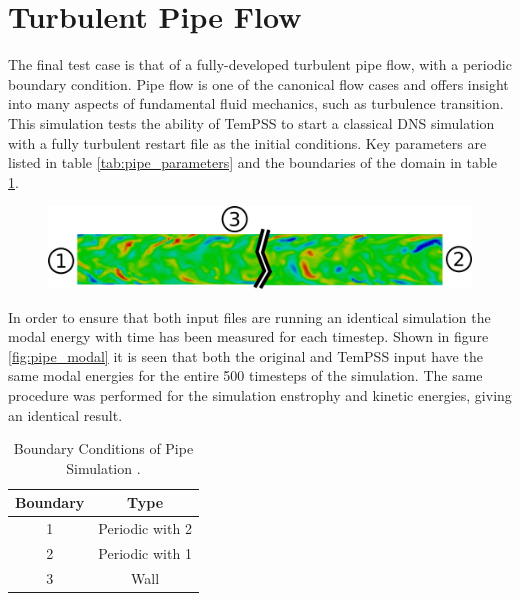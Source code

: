 \documentclass[11pt, a4paper]{report}
\begin{document}
\newpage
\section{Turbulent Pipe Flow}
The final test case is that of a fully-developed turbulent pipe flow, with a periodic boundary condition. Pipe flow is one of the canonical flow cases and offers insight into many aspects of fundamental fluid mechanics, such as turbulence transition. This simulation tests the ability of TemPSS to start a classical DNS simulation with a fully turbulent restart file as the initial conditions. Key parameters are listed in table \ref{tab:pipe_parameters} and the boundaries of the domain in table \ref{tab:pipe_boundaries}.

\begin{figure}[htb!]
 \centering
 \includegraphics[width=.95\linewidth,  clip=true, trim = 0cm 0cm 0cm 0cm]{pipe_domain_real}
 \label{fig:pipe_domain}
\end{figure}

In order to ensure that both input files are running an identical simulation the modal energy with time has been measured for each timestep. Shown in figure \ref{fig:pipe_modal} it is seen that both the original and TemPSS input have the same modal energies for the entire 500 timesteps of the simulation. The same procedure was performed for the simulation enstrophy and kinetic energies, giving an identical result.

\begin{table}[htb!]
	\centering
    \begin{tabular}{ c || c }
    \hline
    Boundary & Type \\
    \hline
    1 & Periodic with 2 \\
    2 & Periodic with 1\\
    3 & Wall \\
    \hline
    \end{tabular}
    \caption{Boundary Conditions of Pipe Simulation	.}
    \label{tab:pipe_boundaries}
\end{table}
\end{document}
